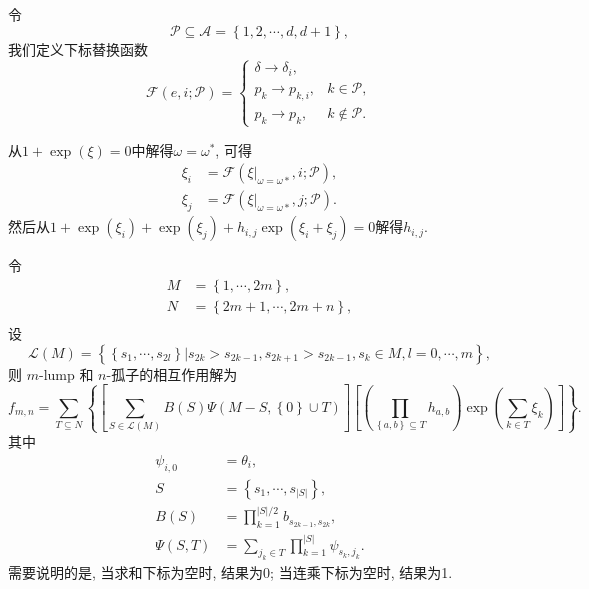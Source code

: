 \documentclass{article}
\newcommand{\sbrace}[1]{\left(#1\right)}
\newcommand{\mbrace}[1]{\left[#1\right]}
\newcommand{\bbrace}[1]{\left\{#1\right\}}
\newcommand{\eval}[2]{\left.{#1}\right|_{#2}}
\newcommand{\ALLP}{\mathcal{A}}
\newcommand{\PS}{\mathcal{P}}
\begin{document}
令
\begin{equation}
\PS\subseteq \ALLP=\bbrace{1,2,\cdots,d,d+1} ,
\end{equation}
我们定义下标替换函数
\begin{equation}
\mathcal F\sbrace{e,i;\PS}=\left\{\begin{array}{ll}
  \delta \to \delta_i, &  \\ 
  p_k \to p_{k,i}, & k \in \PS ,\\ 
  p_k \to p_k , & k \not\in\PS .
\end{array}\right.
\end{equation}

从$1+\exp(\xi)=0$中解得$\omega=\omega^*$, 可得 
\begin{equation}
\begin{aligned}
  \xi_i&=\mathcal{F}\sbrace{\eval{\xi}{\omega=\omega*},i;\PS} ,\\
  \xi_j&=\mathcal{F}\sbrace{\eval{\xi}{\omega=\omega*},j;\PS} .
\end{aligned}
\end{equation}
然后从$1+\exp(\xi_i)+\exp(\xi_j)+h_{i,j}\exp(\xi_i+\xi_j)=0$解得$h_{i,j}$. 

令
\begin{equation}
\begin{aligned}
M&=\bbrace{1,\cdots,2m}, \\ 
N&=\bbrace{2m+1,\cdots,2m+n}, \\ 
\end{aligned}
\end{equation}
设
\begin{equation}
\mathcal{L}(M)=\bbrace{\bbrace{s_1,\cdots,s_{2l}}|s_{2k}>s_{2k-1},s_{2k+1}>s_{2k-1},s_k\in M,l=0,\cdots,m} , 
\end{equation}
则 $m$-lump 和 $n$-孤子的相互作用解为
\begin{equation}
f_{m,n}=\sum_{T\subseteq N}\bbrace{
  \mbrace{
    \sum_{S\in \mathcal{L}(M)}{
      B(S)
      \Psi\sbrace{M-S,\bbrace{0}\cup T}
    }
  }
  \mbrace{
    \sbrace{\prod_{\bbrace{a,b}\subseteq T}{h_{a,b}}}
    \exp\sbrace{\sum_{k\in T}{\xi_k}}
  }
}. 
\end{equation}
其中 
\begin{equation}
\begin{aligned}
\psi_{i,0}&=\theta_i, \\ 
S&=\bbrace{s_1,\cdots,s_{|S|}}, \\ 
B(S)&=\prod_{k=1}^{|S|/2}{b_{s_{2k-1},s_{2k}}},\\ 
\Psi(S,T)&=\sum_{j_k\in T}{\prod_{k=1}^{|S|}{\psi_{s_k,j_k}}}.
\end{aligned}
\end{equation}
需要说明的是, 当求和下标为空时, 结果为0; 当连乘下标为空时, 结果为1. 
\end{document}
